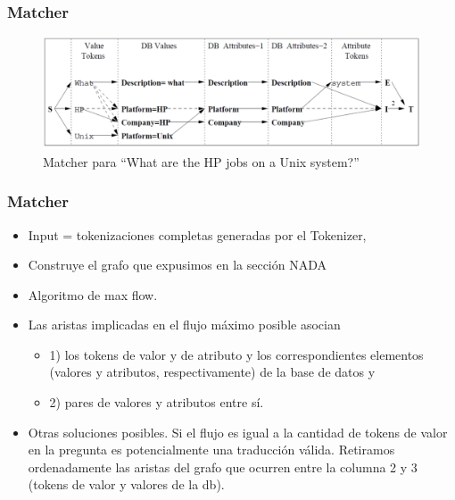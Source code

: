 \begin{frame}
\frametitle{Matcher}

\begin{figure}
  \centering
    \includegraphics[scale=0.3]{graficos/popescu-example-2}
  \caption{Matcher para ``What are the HP jobs on a Unix system?''}
  \label{fig:popescu-example-2}
\end{figure}
\end{frame}


\begin{frame}
\frametitle{Matcher}
  
  \begin{itemize}
    \item Input = tokenizaciones completas generadas por el Tokenizer,
    \item Construye el grafo {\color{red} que expusimos en la sección NADA}
    \item Algoritmo de max flow.
    \item Las aristas implicadas en el flujo máximo posible asocian 
    \begin{itemize}
      \item 1) los tokens de valor y de atributo y los correspondientes elementos (valores y atributos, respectivamente) de la base de datos y 
      \item 2) pares de valores y atributos entre sí.
    \end{itemize}
    \item Otras soluciones posibles. Si el flujo es igual a la cantidad de tokens de valor en la pregunta es potencialmente una traducción válida. Retiramos ordenadamente las aristas del grafo que ocurren entre la columna 2 y 3 (tokens de valor y valores de la db).
\end{itemize}

\end{frame}

